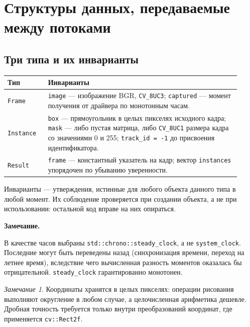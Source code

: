 \documentclass[11pt,a4paper]{article}
\theoremstyle{definition}
\theoremstyle{remark}
\newtheorem*{remark}{Замечание}
\newenvironment{note}
  {\par\medskip\noindent
   \begin{lrbox}{\notebox}%
   \begin{minipage}{0.93\linewidth}%
   \small\textbf{Замечание.}\par\vspace{1pt}\noindent\ignorespaces}
  {\end{minipage}%
   \end{lrbox}%
   \fboxsep=6pt\relax
   \colorbox{codebg}{\usebox{\notebox}}%
   \par\medskip}
\begin{document}
\section{Структуры данных, передаваемые между потоками}
\label{sec:data}

\subsection{Три типа и их инварианты}

\begin{center}
\begin{tabular}{p{0.16\linewidth}p{0.76\linewidth}}
\toprule
Тип & Инварианты \\
\midrule
\texttt{Frame} & \texttt{image} --- изображение BGR, \texttt{CV\_8UC3};
\texttt{captured} --- момент получения от драйвера по монотонным часам. \\
\texttt{Instance} & \texttt{box} --- прямоугольник в целых пикселях исходного
кадра; \texttt{mask} --- либо пустая матрица, либо \texttt{CV\_8UC1} размера
кадра со значениями 0 и 255; \texttt{track\_id = -1} до присвоения
идентификатора. \\
\texttt{Result} & \texttt{frame} --- константный указатель на кадр; вектор
\texttt{instances} упорядочен по убыванию уверенности. \\
\bottomrule
\end{tabular}
\end{center}

Инварианты --- утверждения, истинные для любого объекта данного типа в любой
момент. Их соблюдение проверяется при создании объекта, а не при
использовании: остальной код вправе на них опираться.

\begin{note}
В качестве часов выбраны \texttt{std::chrono::steady\_clock}, а не
\texttt{system\_clock}. Последние могут быть переведены назад (синхронизация
времени, переход на летнее время), вследствие чего вычисленная разность
моментов оказалась бы отрицательной. \texttt{steady\_clock} гарантированно
монотонен.
\end{note}

\begin{remark}
Координаты хранятся в целых пикселях: операции рисования выполняют округление
в любом случае, а целочисленная арифметика дешевле. Дробная точность требуется
только внутри преобразований координат, где применяется \texttt{cv::Rect2f}.
\end{remark}
\end{document}
